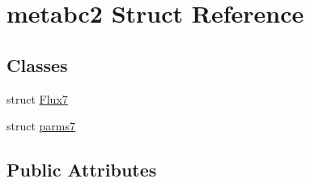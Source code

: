 \hypertarget{structmetabc2}{\section{metabc2 Struct Reference}
\label{structmetabc2}
}
\subsection*{Classes}
\begin{DoxyCompactItemize}
\item 
struct \hyperlink{structmetabc2_1_1_flux7}{Flux7}
\item 
struct \hyperlink{structmetabc2_1_1parms7}{parms7}
\end{DoxyCompactItemize}
\subsection*{Public Attributes}
